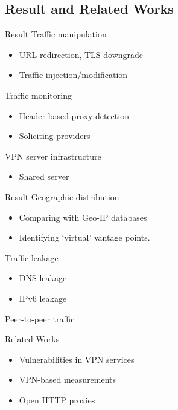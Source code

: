 \documentclass{beamer}
\begin{document}
\subsection{Result and Related Works}

\begin{frame}{Result}
  Traffic manipulation
  \begin{itemize}
    \item URL redirection, TLS downgrade
    \item Traffic injection/modification
  \end{itemize} \pause{}

  Traffic monitoring
  \begin{itemize}
    \item Header-based proxy detection
    \item Soliciting providers
  \end{itemize} \pause{}

  VPN server infrastructure
  \begin{itemize}
    \item Shared server
  \end{itemize}

\end{frame}


\begin{frame}{Result}
  Geographic distribution
  \begin{itemize}
    \item Comparing with Geo-IP databases
    \item Identifying `virtual' vantage points.
  \end{itemize}

  Traffic leakage
  \begin{itemize}
    \item DNS leakage
    \item IPv6 leakage
  \end{itemize} \pause{}

  Peer-to-peer traffic

\end{frame}

\begin{frame}{Related Works}
  \begin{itemize}
    \item Vulnerabilities in VPN services
    \item VPN-based measurements
    \item Open HTTP proxies
  \end{itemize}

\end{frame}
\end{document}
